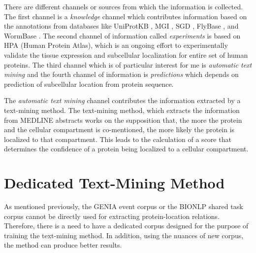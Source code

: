 There are different channels or sources from which the information is collected. The first channel is a \textit{knowledge} channel which contributes information based on the annotations from databases like UniProtKB \cite{magrane2011uniprot}, MGI \cite{bult2008mouse}, SGD \cite{cherry2011saccharomyces}, FlyBase \cite{mcquilton2011flybase}, and WormBase \cite{harris2010wormbase}. The second channel of information called \textit{experiments} is based on HPA (Human Protein Atlas), which is an ongoing effort to experimentally validate  the tissue expression and subcellular localization for entire set of human proteins. The third channel which is of particular interest for me is \textit{automatic text mining} and the fourth channel of information is \textit{predictions} which depends on prediction of subcellular location from protein sequence.

The \textit{automatic text mining} channel contributes the information extracted by a text-mining method. The text-mining method, which extracts the information from MEDLINE abstracts works on the supposition that, the more the protein and the cellular compartment is co-mentioned, the more likely the protein is localized to that compartment. This leads to the calculation of a score that determines the confidence of a protein being localized to a cellular compartment.

\section{Dedicated Text-Mining Method}
%

As mentioned previously, the GENIA event corpus or the BIONLP shared task corpus cannot be directly used for extracting protein-location relations. Therefore, there is a need to have a dedicated corpus designed for the purpose of training the text-mining method. In addition, using the nuances of new corpus, the method can produce better results.


